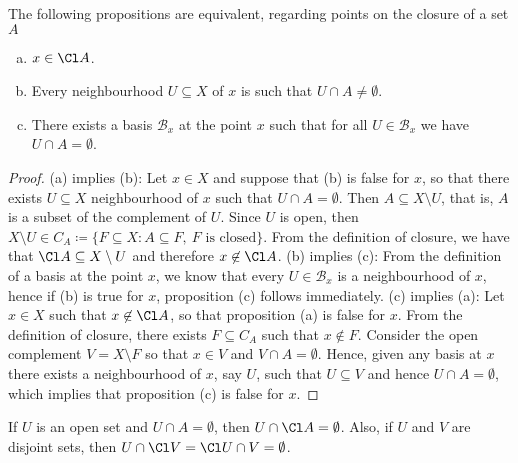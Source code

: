 \begin{proposition}\label{prop: closure equivalent prop}
The following propositions are equivalent, regarding points on the closure of a
set \(A\)
\begin{enumerate}[(a)]\setlength\itemsep{0em}
\item \(x \in \Cl A\).

\item Every neighbourhood \(U \subseteq X\) of \(x\) is such that \(U
  \cap A \neq \emptyset\).

\item There exists a basis \(\mathcal B_x\) at the point \(x\) such that for all
  \(U \in \mathcal B_x\) we have \(U \cap A = \emptyset\).
\end{enumerate}
\end{proposition}

\begin{proof}
(a) implies (b): Let \(x \in X\) and suppose that (b) is false for \(x\), so
that there exists \(U \subseteq X\) neighbourhood of \(x\) such that \(U \cap A
= \emptyset\). Then \(A \subseteq X \setminus U\), that is, \(A\) is a subset of
the complement of \(U\). Since \(U\) is open, then \(X \setminus U \in C_A
\coloneq \{F \subseteq X \colon A \subseteq F,\ F \text{ is closed}\}\). From the
definition of closure, we have that \(\Cl A \subseteq X \setminus U\) and
therefore \(x \not\in \Cl A\). (b) implies (c): From the definition of a
basis at the point \(x\), we know that every \(U \in \mathcal B_x\) is a
neighbourhood of \(x\), hence if (b) is true for \(x\), proposition (c) follows
immediately. (c) implies (a): Let \(x \in X\) such that \(x \not\in \Cl
A\), so that proposition (a) is false for \(x\).  From the definition of
closure, there exists \(F \subseteq C_A\) such that \(x \not\in F\). Consider
the open complement \(V = X \setminus F\) so that \(x \in V\) and \(V \cap A =
\emptyset\). Hence, given any basis at \(x\) there exists a neighbourhood of
\(x\), say \(U\), such that \(U \subseteq V\) and hence \(U \cap A =
\emptyset\), which implies that proposition (c) is false for \(x\).
\end{proof}

\begin{corollary}\label{cor: disjoint closure persistence}
If \(U\) is an open set and \(U \cap A = \emptyset\), then \(U \cap \Cl
A = \emptyset\). Also, if \(U\) and \(V\) are disjoint sets, then \(U \cap
\Cl V = \Cl U \cap V = \emptyset\).
\end{corollary}

